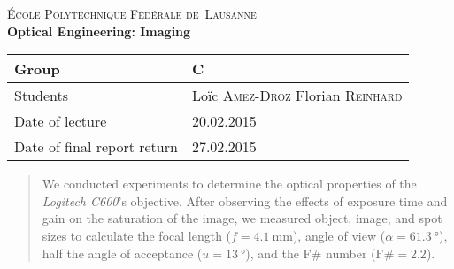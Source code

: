 \begin{titlepage}
\begin{center}
    \textsc{\LARGE École Polytechnique Fédérale de~Lausanne}\\[1.5cm] 
    {\huge \bfseries Optical Engineering: Imaging}\\[0.4cm] 
    \begin{tabular}{|p{5cm}|p{4cm}|}
        \hline
        Group & C \\ \hline
        Students & Loïc \textsc{Amez-Droz} \newline Florian \textsc{Reinhard} \\ \hline
        Date of lecture & 20.02.2015 \\ \hline
        Date of final report return & 27.02.2015 \\ \hline
    \end{tabular}
\end{center}


\begin{abstract}
    We conducted experiments to determine the optical properties of the \emph{Logitech C600}'s objective.
    After observing the effects of exposure time and gain on the saturation of the image,
    we measured object, image, and spot sizes to calculate the focal length ($ f = \SI{4.1}{\milli\meter}$), angle of view ($\alpha = \SI{61.3}{\degree}$), half the angle of acceptance ($u = \SI{13}{\degree}$), and the F\# number ($ \mbox{F\#} = 2.2 $).
\end{abstract}
 
\vfill
\end{titlepage}
